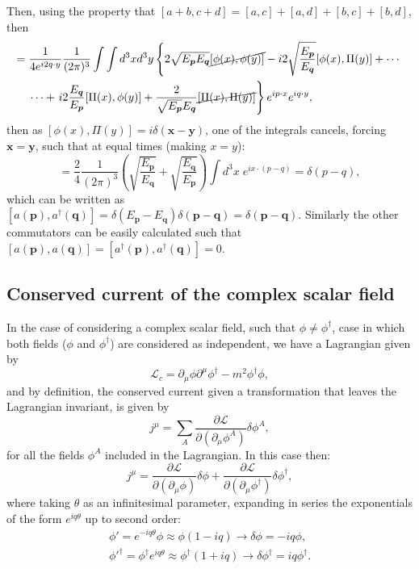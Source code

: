 Then, using the property that $[a + b, c + d] = [a, c] + [a,d] + [b, c] + [b, d]$, then
\begin{align*}
    [a(\bm{p}), a^{\dagger}(\bm{q})] = \; &\dfrac{1}{4e^{i2q\cdot y}} \dfrac{1}{(2\pi)^3} \int\int d^3x d^3y \left\{ 2\sqrt{E_{\bm{p}}E_{\bm{q}}}\cancel{[\phi(x), \phi(y)]} - i2\sqrt{\dfrac{E_{\bm{p}}}{E_{\bm{q}}}}[\phi(x), \Pi(y)] + \dotsm \right.\\
    &\dotsm + \left. i2\dfrac{E_{\bm{q}}}{E_{\bm{p}}}[\Pi(x), \phi(y)] + \dfrac{2}{\sqrt{E_{\bm{p}}}E_{\bm{q}}}\cancel{[\Pi(x), \Pi(y)]} \right\} e^{ip\cdot x}e^{iq\cdot y},
\end{align*}
then as $[\phi(x), \Pi(y)] = i\delta(\bm{x} - \bm{y})$, one of the integrals cancels, forcing $\bm{x} = \bm{y}$, such that at equal times (making $x = y$):
\begin{equation*}
    [a(\bm{p}), a^{\dagger}(\bm{q})] = \dfrac{2}{4}\dfrac{1}{(2\pi)^3} \left( \sqrt{\dfrac{E_{\bm{p}}}{E_{\bm{q}}}} + \sqrt{\dfrac{E_{\bm{q}}}{E_{\bm{p}}}} \right) \int d^3x \; e^{ix\cdot(p-q)} = \delta(p-q),
\end{equation*}
which can be written as $[a(\bm{p}), a^{\dagger}(\bm{q})] = \delta(E_{\bm{p}} - E_{\bm{q}})\delta(\bm{p} - \bm{q}) = \delta(\bm{p} - \bm{q})$. Similarly the other commutators can be easily calculated such that $[a(\bm{p}), a(\bm{q})] = [a^{\dagger}(\bm{p}), a^{\dagger}(\bm{q})] = 0$.

\subsection{Conserved current of the complex scalar field}

In the case of considering a complex scalar field, such that $\phi \neq \phi^{\dagger}$, case in which both fields ($\phi$ and $\phi^{\dagger}$) are considered as independent, we have a Lagrangian given by
\begin{equation*}
    \mathcal{L}_c = \partial_{\mu}\phi\partial^{\mu}\phi^{\dagger} - m^2\phi^{\dagger}\phi,
\end{equation*}
and by definition, the conserved current given a transformation that leaves the Lagrangian invariant, is given by
\begin{equation*}
    j^{\mu} = \sum_A \dfrac{\partial\mathcal{L}}{\partial(\partial_{\mu}\phi^A)}\delta\phi^A,
\end{equation*}
for all the fields $\phi^A$ included in the Lagrangian. In this case then:
\begin{equation*}
    j^{\mu} = \dfrac{\partial\mathcal{L}}{\partial(\partial_{\mu}\phi)}\delta\phi + \dfrac{\partial\mathcal{L}}{\partial(\partial_{\mu}\phi^{\dagger})}\delta\phi^{\dagger},
\end{equation*}
where taking $\theta$ as an infinitesimal parameter, expanding in series the exponentials of the form $e^{iq\theta}$ up to second order:
\begin{gather}
\label{var1}
    \phi' = e^{-iq\theta}\phi \approx \phi(1 - iq) \rightarrow \delta\phi = -iq\phi, \\
\label{var2}
    \phi'^{\dagger} = \phi^{\dagger}e^{iq\theta} \approx \phi^{\dagger}(1 + iq) \rightarrow \delta\phi^{\dagger} = iq\phi^{\dagger}.
\end{gather}


